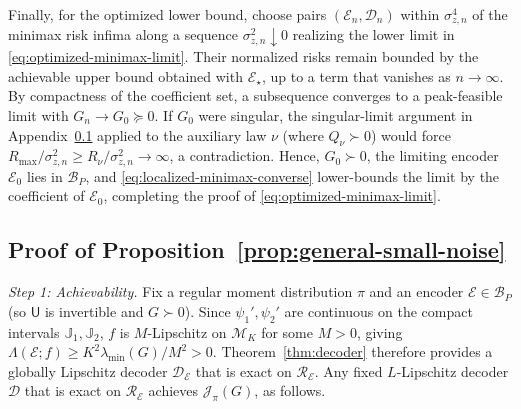 \documentclass[journal,12pt,onecolumn,draftclsnofoot]{IEEEtran}
\newcommand{\enc}{\mathscr{E}}\newcommand{\dec}{\mathscr{D}}\newcommand{\R}{\mathbb R}\newcommand{\C}{\mathbb C}
\begin{document}
Finally, for the optimized lower bound, choose pairs $(\enc_n,\dec_n)$ within $\sigma_{z,n}^4$ of the minimax risk infima along a sequence $\sigma_{z,n}^2\downarrow0$ realizing the lower limit in \eqref{eq:optimized-minimax-limit}.
Their normalized risks remain bounded by the achievable upper bound obtained with $\enc_\star$, up to a term that vanishes as $n\to\infty$.
By compactness of the coefficient set, a subsequence converges to a peak-feasible limit with $G_n\to G_0\succeq0$.
If $G_0$ were singular, the singular-limit argument in Appendix~\ref{genstat:information} applied to the auxiliary law $\nu$ (where $Q_\nu\succ0$) would force $R_{\max}/\sigma_{z,n}^2\ge R_\nu/\sigma_{z,n}^2\to\infty$, a contradiction.
Hence, $G_0\succ0$, the limiting encoder $\enc_0$ lies in $\mathcal B_P$, and \eqref{eq:localized-minimax-converse} lower-bounds the limit by the coefficient of $\enc_0$, completing the proof of \eqref{eq:optimized-minimax-limit}.





\subsection{Proof of Proposition~\ref{prop:general-small-noise}}\label{genstat:information}



\emph{Step 1: Achievability.}
Fix a regular moment distribution $\pi$ and an encoder $\enc\in\mathcal B_P$ (so $\mathsf U$ is invertible and $G\succ0$). 
Since $\psi_1',\psi_2'$ are continuous on the compact intervals $\mathbb J_1,\mathbb J_2$, $f$ is $M$-Lipschitz on $\mathcal M_K$ for some $M>0$, giving $\Lambda(\enc;f)\ge K^2\lambda_{\min}(G)/M^2>0$. 
Theorem~\ref{thm:decoder} therefore provides a globally Lipschitz decoder $\dec_\enc$ that is exact on $\mathcal R_\enc$. Any fixed $L$-Lipschitz decoder $\dec$ that is exact on $\mathcal R_\enc$ achieves $\mathcal J_\pi(G)$, as follows.
\end{document}
